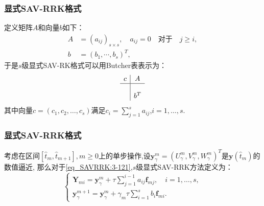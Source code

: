 \documentclass[aspectratio=169]{beamer}
\numberwithin{theorem}{section} %
\begin{document}
\begin{frame}\frametitle{显式SAV-RRK格式}
	定义矩阵$A$和向量$b$如下：
	\begin{equation}
	\begin{aligned}
	A & =\left(a_{i j}\right)_{s \times s}, \quad a_{i j}=0 \quad \text {对于} \quad j \geq i, \\
	b & =\left(b_1, \cdots, b_s\right)^T,
	\end{aligned}
	\end{equation}
	于是$s$级显式SAV-RK格式可以用Butcher表表示为：
	\begin{equation}
	\begin{array}{c|c}
	c & A \\
	\hline \\
	& b^T
	\end{array}
	\end{equation}
	其中向量$c=(c_1,c_2,\dots,c_s)$满足$c_i=\sum\limits_{j=1}^s a_{i j}$,$i=1, \ldots, s$.
	
\end{frame}

\begin{frame}\frametitle{显式SAV-RRK格式}
	考虑在区间$\left[\hat{t}_m, \hat{t}_{m+1}\right], m \geq 0$上的单步操作,设$\bm{y}_\gamma^m=\left(U^{m}_{\gamma},V^{m}_{\gamma},W^{m}_{\gamma}\right)^T$是$\bm{y}\left(\hat{t}_m\right)$的数值逼近,
	那么对于\eqref{eq_SAVRRK:3-121},$s$级显式SAV-RRK方法定义为：
	\begin{equation}
	\left\{\begin{array}{l}
	\bm{Y}_{m i}=\bm{y}_\gamma^m+\tau \sum\limits_{j=1}^{i-1} a_{i j} \bm{f}_{m j}, \quad i=1, \ldots, s, \\
	\bm{y}_\gamma^{m+1}=\bm{y}_\gamma^m+\gamma_m \tau \sum\limits_{i=1}^s b_i \bm{f}_{m i}.
	\end{array}\right.\label{eq_SAVRRK:4-3}
	\end{equation}
\end{frame}
\end{document}
